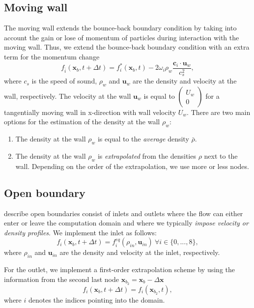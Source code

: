 \documentclass[a4paper,11pt, footsepline]{book}
\begin{document}
\subsection*{Moving wall}
The moving wall extends the bounce-back boundary condition by taking into account the gain or lose of momentum of particles during interaction with the moving wall. Thus, we extend the bounce-back boundary condition with an extra term for the momentum change
\begin{equation}
f_{\bar{i}}(\mathbf{x}_{b},t+\Delta t)=f_{i}^{\ast}(\mathbf{x}_{b},t)-2\omega_{i}\rho_{w}\frac{\mathbf{c}_{i}\cdot\mathbf{u}_{w}}{c_{s}^{2}},
\end{equation}
where $c_{s}$ is the speed of sound, $\rho_{w}$ and $\mathbf{u}_{w}$ are the density and velocity at the wall, respectively. The velocity at the wall $\mathbf{u}_{w}$ is equal to $\begin{pmatrix}U_{w}\\0\end{pmatrix}$ for a tangentially moving wall in x-direction with wall velocity $U_{w}$.  
There are two main options for the estimation of the density at the wall $\rho_{w}$:
\begin{enumerate}
\item The density at the wall $\rho_{w}$ is equal to the \textit{average} density $\bar{\rho}$.
\item The density at the wall $\rho_{w}$ is \textit{extrapolated} from the densities $\rho$ next to the wall. Depending on the order of the extrapolation, we use more or less nodes.
\end{enumerate}
\subsection*{Open boundary}
\cite{Kruger.2016} describe open boundaries consist of inlets and outlets where the flow can either enter or leave the computation domain and where we typically \textit{impose velocity or density profiles}. We implement the inlet as follows:
\begin{equation}
f_{i}(\mathbf{x}_{b},t+\Delta t)=f_{i}^{eq}(\rho_{in},\mathbf{u}_{in})~\forall i\in\lbrace 0,...,8\rbrace,
\end{equation}
where $\rho_{in}$ and $\mathbf{u}_{in}$ are the density and velocity at the inlet, respectively.

For the outlet, we implement a first-order extrapolation scheme by using the information from the second last node $\mathbf{x}_{b_{2}}=\mathbf{x}_{b}-\Delta\mathbf{x}$
\begin{equation}
f_{i}(\mathbf{x}_{b},t+\Delta t)=f_{i}(\mathbf{x}_{b_{2}},t),
\end{equation}
where $i$ denotes the indices pointing into the domain.
\end{document}
